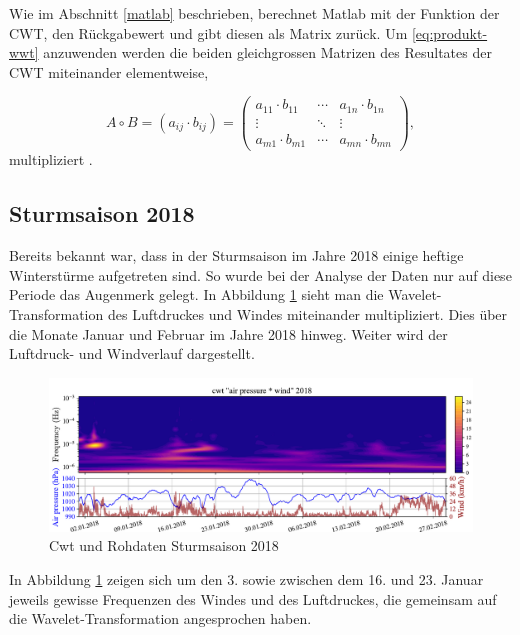 \begin{refsection}
Wie im Abschnitt \ref{matlab} beschrieben, berechnet Matlab mit der Funktion der CWT, den Rückgabewert und gibt diesen als Matrix zurück.
Um \eqref{eq:produkt-wwt} anzuwenden werden die beiden gleichgrossen Matrizen des Resultates der CWT miteinander elementweise,

\begin{equation}
	A\circ B=(a_{{ij}}\cdot b_{{ij}})={\begin{pmatrix}a_{{11}}\cdot b_{{11}}&\cdots &a_{{1n}}\cdot b_{{1n}}\\\vdots &\ddots &\vdots \\a_{{m1}}\cdot b_{{m1}}&\cdots &a_{{mn}}\cdot b_{{mn}}\end{pmatrix}},
\end{equation}
multipliziert \cite{online:schur}.




\subsection{Sturmsaison 2018}
Bereits bekannt war, dass in der Sturmsaison im Jahre 2018 einige heftige Winterstürme aufgetreten sind.
So wurde bei der Analyse der Daten nur auf diese Periode das Augenmerk gelegt. 
In Abbildung \ref{fig:cwt_storm} \space sieht man die Wavelet-Transformation des Luftdruckes und Windes miteinander multipliziert.
Dies über die Monate Januar und Februar im Jahre 2018 hinweg.
Weiter wird der Luftdruck- und Windverlauf dargestellt.
 
\begin{figure}
	\centering
	\includegraphics[width=1\textwidth]{papers/wwt/images/storm_airp_wind.pdf}
	\caption{Cwt und Rohdaten Sturmsaison 2018}
	\label{fig:cwt_storm}
\end{figure}

In Abbildung \ref{fig:cwt_storm} \space zeigen sich um den 3. sowie zwischen dem 16. und 23. Januar jeweils gewisse Frequenzen des Windes und des Luftdruckes, die gemeinsam auf die Wavelet-Transformation angesprochen haben.


\end{refsection}
